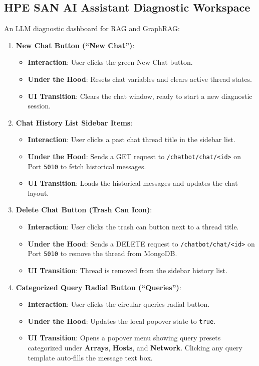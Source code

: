 \documentclass[11pt,a4paper]{article}
\begin{document}
\subsection{HPE SAN AI Assistant Diagnostic Workspace}
An LLM diagnostic dashboard for RAG and GraphRAG:
\begin{enumerate}
    \item \textbf{New Chat Button (``New Chat'')}:
    \begin{itemize}
        \item \textbf{Interaction}: User clicks the green New Chat button.
        \item \textbf{Under the Hood}: Resets chat variables and clears active thread states.
        \item \textbf{UI Transition}: Clears the chat window, ready to start a new diagnostic session.
    \end{itemize}
    
    \item \textbf{Chat History List Sidebar Items}:
    \begin{itemize}
        \item \textbf{Interaction}: User clicks a past chat thread title in the sidebar list.
        \item \textbf{Under the Hood}: Sends a GET request to \texttt{/chatbot/chat/<id>} on Port \texttt{5010} to fetch historical messages.
        \item \textbf{UI Transition}: Loads the historical messages and updates the chat layout.
    \end{itemize}
    
    \item \textbf{Delete Chat Button (Trash Can Icon)}:
    \begin{itemize}
        \item \textbf{Interaction}: User clicks the trash can button next to a thread title.
        \item \textbf{Under the Hood}: Sends a DELETE request to \texttt{/chatbot/chat/<id>} on Port \texttt{5010} to remove the thread from MongoDB.
        \item \textbf{UI Transition}: Thread is removed from the sidebar history list.
    \end{itemize}
    
    \item \textbf{Categorized Query Radial Button (``Queries'')}:
    \begin{itemize}
        \item \textbf{Interaction}: User clicks the circular queries radial button.
        \item \textbf{Under the Hood}: Updates the local popover state to \texttt{true}.
        \item \textbf{UI Transition}: Opens a popover menu showing query presets categorized under \textbf{Arrays}, \textbf{Hosts}, and \textbf{Network}. Clicking any query template auto-fills the message text box.
    \end{itemize}
    

\end{enumerate}
\end{document}
